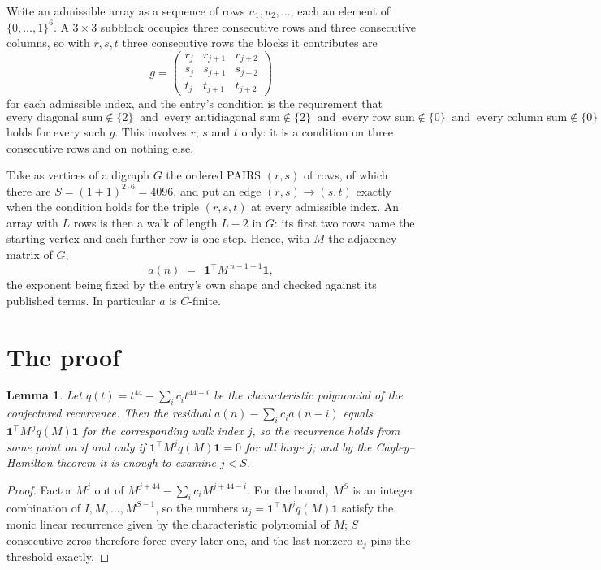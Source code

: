 \documentclass[11pt,a4paper]{article}
\theoremstyle{plain}
\newtheorem{lemma}[theorem]{Lemma}
\theoremstyle{definition}
\begin{document}
Write an admissible array as a sequence of rows $u_1,u_2,\dots$, each an element of
$\{0,\dots,1\}^{6}$. A $3\times3$ subblock occupies three consecutive rows and
three consecutive columns, so with $r,s,t$ three consecutive rows the blocks it
contributes are
\[
g=\begin{pmatrix}r_j&r_{j+1}&r_{j+2}\\ s_j&s_{j+1}&s_{j+2}\\ t_j&t_{j+1}&t_{j+2}\end{pmatrix}
\]
for each admissible index, and the entry's condition is the requirement that
\[
\text{every diagonal sum} \notin \{2\}\ \text{ and }\ \text{every antidiagonal sum} \notin \{2\}\ \text{ and }\ \text{every row sum} \notin \{0\}\ \text{ and }\ \text{every column sum} \notin \{0\}
\]
holds for every such $g$. This involves $r$, $s$ and $t$ only: it is a condition on
three consecutive rows and on nothing else.

Take as vertices of a digraph $G$ the ordered PAIRS $(r,s)$ of rows, of which there are
$S=(1+1)^{2\cdot6}=4096$, and put an edge $(r,s)\to(s,t)$ exactly when the condition
holds for the triple $(r,s,t)$ at every admissible index. An array with $L$ rows is then a
walk of length $L-2$ in $G$: its first two rows name the starting vertex and each further
row is one step. Hence, with $M$ the adjacency matrix of $G$,
\[
a(n)\;=\;\,\mathbf{1}^{\!\top}M^{\,n-1+1}\mathbf{1},
\]
the exponent being fixed by the entry's own shape and checked against its published terms.
In particular $a$ is $C$-finite.

\section{The proof}

\begin{lemma}\label{lem:crit}
Let $q(t)=t^{44}-\sum_i c_it^{44-i}$ be the characteristic polynomial of the
conjectured recurrence. Then the residual $a(n)-\sum_ic_ia(n-i)$ equals
$\mathbf{1}^{\!\top}M^{\,j}q(M)\mathbf{1}$ for the corresponding walk index
$j$, so the recurrence holds from some point on if and only if
$\mathbf{1}^{\!\top}M^{j}q(M)\mathbf{1}=0$ for all large $j$; and by the
Cayley--Hamilton theorem it is enough to examine $j<S$.
\end{lemma}

\begin{proof}
Factor $M^{j}$ out of $M^{j+44}-\sum_ic_iM^{j+44-i}$. For the bound, $M^{S}$
is an integer combination of $I,M,\dots,M^{S-1}$, so the numbers
$u_j=\mathbf{1}^{\!\top}M^{j}q(M)\mathbf{1}$ satisfy the monic linear recurrence given by
the characteristic polynomial of $M$; $S$ consecutive zeros therefore force every later one,
and the last nonzero $u_j$ pins the threshold exactly.
\end{proof}
\end{document}
